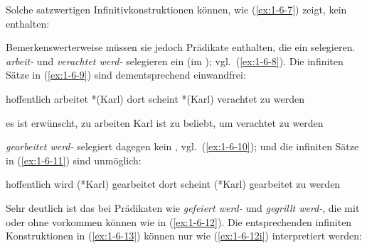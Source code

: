 \documentclass[output=paper]{langsci/langscibook}
\begin{document}
Solche satzwertigen Infinitivkonstruktionen können, wie (\ref{ex:1-6-7}) zeigt, kein 
enthalten:
\begin{exe}
\ex\label{ex:1-6-7}
\begin{xlist}
\end{xlist}
\end{exe}
Bemerkenswerterweise müssen sie jedoch Prädikate enthalten, die ein  selegieren. \textit{arbeit-} und \textit{verachtet werd-} selegieren ein  (im ); vgl.\ (\ref{ex:1-6-8}). Die infiniten Sätze in (\ref{ex:1-6-9}) sind dementsprechend einwandfrei:
\begin{exe}
\ex\label{ex:1-6-8}
\begin{xlist}
\ex\label{ex:1-6-8a} hoffentlich arbeitet *(Karl)
\ex\label{ex:1-6-8b} dort scheint *(Karl) verachtet zu werden
\end{xlist}
\end{exe}
\begin{exe}
\ex\label{ex:1-6-9}
\begin{xlist}
\ex\label{ex:1-6-9a} es ist erwünscht, zu arbeiten
\ex\label{ex:1-6-9b} Karl ist zu beliebt, um verachtet zu werden
\end{xlist}
\end{exe}
\textit{gearbeitet werd-} selegiert dagegen kein , vgl.\ (\ref{ex:1-6-10}); und die infiniten Sätze
in (\ref{ex:1-6-11}) sind unmöglich:
\begin{exe}
\ex\label{ex:1-6-10}
\begin{xlist}
\ex\label{ex:1-6-10a} hoffentlich wird (*Karl) gearbeitet
\ex\label{ex:1-6-10b} dort scheint (*Karl) gearbeitet zu werden
\end{xlist}
\end{exe}
\begin{exe}
\ex\label{ex:1-6-11}
\begin{xlist}
\end{xlist}
\end{exe}
Sehr deutlich ist das bei Prädikaten wie \textit{gefeiert werd-} und \textit{gegrillt werd-}, die
mit oder ohne  vorkommen können wie in (\ref{ex:1-6-12}). Die entsprechenden infiniten Konstruktionen in (\ref{ex:1-6-13}) können nur wie (\ref{ex:1-6-12i}) interpretiert werden:
\end{document}
